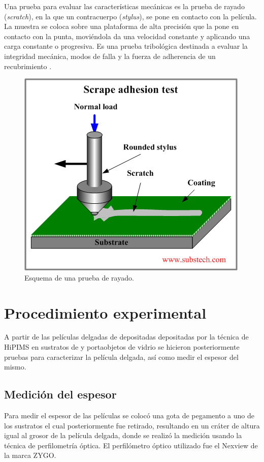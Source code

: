 \documentclass[12pt]{IEEEtran}
\begin{document}
Una prueba para evaluar las características mecánicas es la prueba de rayado (\emph{scratch}), en la que un contracuerpo (\emph{stylus}), se pone en contacto con la película. La muestra se coloca sobre una plataforma de alta precisión que la pone en contacto con la punta, moviéndola da una velocidad constante y aplicando una carga constante o progresiva. Es una prueba tribológica destinada a evaluar la integridad mecánica, modos de falla y la fuerza de adherencia de un recubrimiento \cite{internationalStandardTestMethod}.

\begin{figure}[htp]
	\centering
	\includegraphics[width=0.8\linewidth]{scratch-test}
	\caption{Esquema de una prueba de rayado. \cite{kopeliovich_adhesion_nodate}}
	\label{fig:scratch-test}
\end{figure}

\section{Procedimiento experimental}

A partir de las películas delgadas de  depositadas depositadas por la técnica de HiPIMS en sustratos de  y portaobjetos de vidrio se hicieron posteriormente pruebas para caracterizar la película delgada, así como medir el espesor del mismo.

\subsection{Medición del espesor}

Para medir el espesor de las películas se colocó una gota de pegamento a uno de los sustratos el cual posteriormente fue retirado, resultando en un cráter de altura igual al grosor de la película delgada, donde se realizó la medición usando la técnica de perfilometría óptica. El perfilómetro óptico utilizado fue el Nexview de la marca ZYGO.
\end{document}
